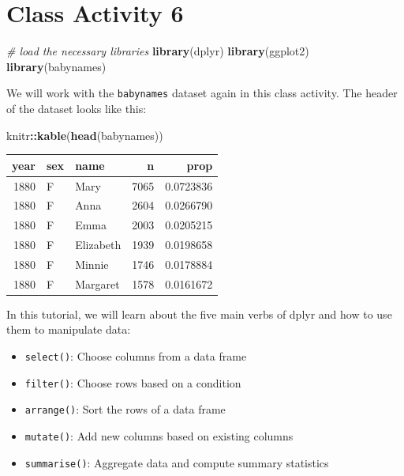 \documentclass[
]{book}
\newenvironment{Shaded}{\begin{snugshade}}{\end{snugshade}}
\newcommand{\CommentTok}[1]{\textcolor[rgb]{0.56,0.35,0.01}{\textit{#1}}}
\newcommand{\FunctionTok}[1]{\textcolor[rgb]{0.13,0.29,0.53}{\textbf{#1}}}
\newcommand{\NormalTok}[1]{#1}
\newcommand{\SpecialCharTok}[1]{\textcolor[rgb]{0.81,0.36,0.00}{\textbf{#1}}}
\providecommand{\tightlist}{%
  \setlength{\itemsep}{0pt}\setlength{\parskip}{0pt}}
\begin{document}
\hypertarget{class-activity-6}{%
\chapter{Class Activity 6}\label{class-activity-6}}

\begin{Shaded}
\begin{Highlighting}[]
\CommentTok{\# load the necessary libraries}
\FunctionTok{library}\NormalTok{(dplyr)}
\FunctionTok{library}\NormalTok{(ggplot2)}
\FunctionTok{library}\NormalTok{(babynames)}
\end{Highlighting}
\end{Shaded}

We will work with the \texttt{babynames} dataset again in this class activity. The header of the dataset looks like this:

\begin{Shaded}
\begin{Highlighting}[]
\NormalTok{knitr}\SpecialCharTok{::}\FunctionTok{kable}\NormalTok{(}\FunctionTok{head}\NormalTok{(babynames))}
\end{Highlighting}
\end{Shaded}

\begin{tabular}{r|l|l|r|r}
\hline
year & sex & name & n & prop\\
\hline
1880 & F & Mary & 7065 & 0.0723836\\
\hline
1880 & F & Anna & 2604 & 0.0266790\\
\hline
1880 & F & Emma & 2003 & 0.0205215\\
\hline
1880 & F & Elizabeth & 1939 & 0.0198658\\
\hline
1880 & F & Minnie & 1746 & 0.0178884\\
\hline
1880 & F & Margaret & 1578 & 0.0161672\\
\hline
\end{tabular}

In this tutorial, we will learn about the five main verbs of dplyr and how to use them to manipulate data:

\begin{itemize}
\tightlist
\item
  \texttt{select()}: Choose columns from a data frame
\item
  \texttt{filter()}: Choose rows based on a condition
\item
  \texttt{arrange()}: Sort the rows of a data frame
\item
  \texttt{mutate()}: Add new columns based on existing columns
\item
  \texttt{summarise()}: Aggregate data and compute summary statistics
\end{itemize}
\end{document}
